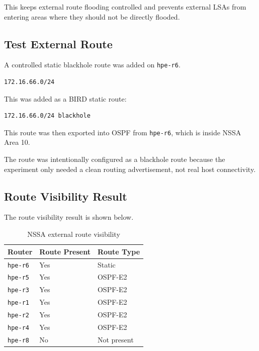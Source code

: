 This keeps external route flooding controlled and prevents external LSAs from entering areas where they should not be directly flooded.

\subsection{Test External Route}

A controlled static blackhole route was added on \texttt{hpe-r6}.

\begin{verbatim}
172.16.66.0/24
\end{verbatim}

This was added as a BIRD static route:

\begin{verbatim}
172.16.66.0/24 blackhole
\end{verbatim}

This route was then exported into OSPF from \texttt{hpe-r6}, which is inside NSSA Area 10.

The route was intentionally configured as a blackhole route because the experiment only needed a clean routing advertisement, not real host connectivity.

\subsection{Route Visibility Result}

The route visibility result is shown below.

\begin{table}[h]
\centering
\begin{tabular}{|l|l|l|}
\hline
\textbf{Router} & \textbf{Route Present} & \textbf{Route Type} \\
\hline
\texttt{hpe-r6} & Yes & Static \\
\hline
\texttt{hpe-r5} & Yes & OSPF-E2 \\
\hline
\texttt{hpe-r3} & Yes & OSPF-E2 \\
\hline
\texttt{hpe-r1} & Yes & OSPF-E2 \\
\hline
\texttt{hpe-r2} & Yes & OSPF-E2 \\
\hline
\texttt{hpe-r4} & Yes & OSPF-E2 \\
\hline
\texttt{hpe-r8} & No & Not present \\
\hline
\end{tabular}
\caption{NSSA external route visibility}
\end{table}

